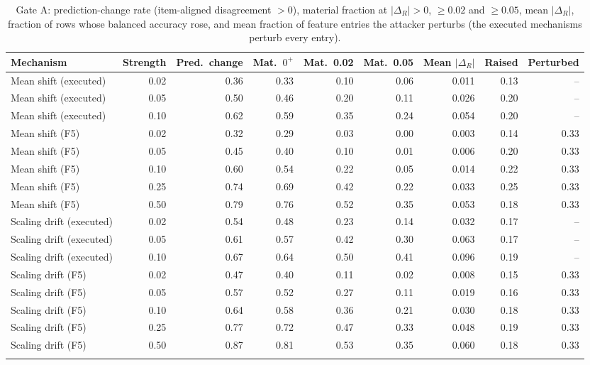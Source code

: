 \begin{table}[!t]
\caption{Gate A: prediction-change rate (item-aligned disagreement $>0$), material fraction at $|\Delta_R|>0$, $\ge0.02$ and $\ge0.05$, mean $|\Delta_R|$, fraction of rows whose balanced accuracy rose, and mean fraction of feature entries the attacker perturbs (the executed mechanisms perturb every entry).}
\label{tab:s-adversarial-materiality}
\centering
\scriptsize
\setlength{\tabcolsep}{3.5pt}
\begin{tabular}{@{}lrrrrrrrr@{}}
\toprule
Mechanism & Strength & Pred.\ change & Mat.\ $0^{+}$ & Mat.\ 0.02 & Mat.\ 0.05 & Mean $|\Delta_R|$ & Raised & Perturbed \\
\midrule
Mean shift (executed) & 0.02 & 0.36 & 0.33 & 0.10 & 0.06 & 0.011 & 0.13 & -- \\
Mean shift (executed) & 0.05 & 0.50 & 0.46 & 0.20 & 0.11 & 0.026 & 0.20 & -- \\
Mean shift (executed) & 0.10 & 0.62 & 0.59 & 0.35 & 0.24 & 0.054 & 0.20 & -- \\
Mean shift (F5) & 0.02 & 0.32 & 0.29 & 0.03 & 0.00 & 0.003 & 0.14 & 0.33 \\
Mean shift (F5) & 0.05 & 0.45 & 0.40 & 0.10 & 0.01 & 0.006 & 0.20 & 0.33 \\
Mean shift (F5) & 0.10 & 0.60 & 0.54 & 0.22 & 0.05 & 0.014 & 0.22 & 0.33 \\
Mean shift (F5) & 0.25 & 0.74 & 0.69 & 0.42 & 0.22 & 0.033 & 0.25 & 0.33 \\
Mean shift (F5) & 0.50 & 0.79 & 0.76 & 0.52 & 0.35 & 0.053 & 0.18 & 0.33 \\
\addlinespace[1pt]
Scaling drift (executed) & 0.02 & 0.54 & 0.48 & 0.23 & 0.14 & 0.032 & 0.17 & -- \\
Scaling drift (executed) & 0.05 & 0.61 & 0.57 & 0.42 & 0.30 & 0.063 & 0.17 & -- \\
Scaling drift (executed) & 0.10 & 0.67 & 0.64 & 0.50 & 0.41 & 0.096 & 0.19 & -- \\
Scaling drift (F5) & 0.02 & 0.47 & 0.40 & 0.11 & 0.02 & 0.008 & 0.15 & 0.33 \\
Scaling drift (F5) & 0.05 & 0.57 & 0.52 & 0.27 & 0.11 & 0.019 & 0.16 & 0.33 \\
Scaling drift (F5) & 0.10 & 0.64 & 0.58 & 0.36 & 0.21 & 0.030 & 0.18 & 0.33 \\
Scaling drift (F5) & 0.25 & 0.77 & 0.72 & 0.47 & 0.33 & 0.048 & 0.19 & 0.33 \\
Scaling drift (F5) & 0.50 & 0.87 & 0.81 & 0.53 & 0.35 & 0.060 & 0.18 & 0.33 \\
\addlinespace[1pt]
\bottomrule
\end{tabular}
\end{table}
